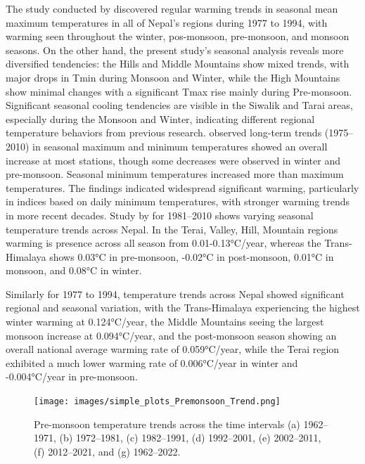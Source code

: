 The study conducted by \textcite{shrestha_climate_2011} discovered regular warming trends in seasonal mean maximum temperatures in all of Nepal's regions during 1977 to 1994, with warming seen throughout the winter, pos-monsoon, pre-monsoon, and monsoon seasons. On the other hand, the present study's seasonal analysis reveals more diversified tendencies: the Hills and Middle Mountains show mixed trends, with major drops in Tmin during Monsoon and Winter, while the High Mountains show minimal changes with a significant Tmax rise mainly during Pre-monsoon. Significant seasonal cooling tendencies are visible in the Siwalik and Tarai areas, especially during the Monsoon and Winter, indicating different regional temperature behaviors from previous research. \textcite{shrestha_observed_2017} observed long-term trends (1975--2010) in seasonal maximum and minimum temperatures showed an overall increase at most stations, though some decreases were observed in winter and pre-monsoon. Seasonal minimum temperatures increased more than maximum temperatures. The findings indicated widespread significant warming, particularly in indices based on daily minimum temperatures, with stronger warming trends in more recent decades. Study  by \textcite{nayava_spatial_2017} for 1981--2010 shows varying seasonal temperature trends across Nepal. In the Terai, Valley, Hill, Mountain regions warming is presence across all season from 0.01-0.13°C/year, whereas the Trans-Himalaya shows 0.03°C in pre-monsoon, -0.02°C in post-monsoon, 0.01°C in monsoon, and 0.08°C in winter.


Similarly \textcite{shrestha_maximum_1999} for 1977 to 1994, temperature trends across Nepal showed significant regional and seasonal variation, with the Trans-Himalaya experiencing the highest winter warming at 0.124°C/year, the Middle Mountains seeing the largest monsoon increase at 0.094°C/year, and the post-monsoon season showing an overall national average warming rate of 0.059°C/year, while the Terai region exhibited a much lower warming rate of 0.006°C/year in winter and -0.004°C/year in pre-monsoon.

\begin{figure}[H] 
  \centering
  \texttt{[image: images/simple\_plots\_Premonsoon\_Trend.png]}  
  \caption{Pre-monsoon temperature trends across the time intervals (a) 1962–1971, (b) 1972–1981, (c) 1982–1991, (d) 1992–2001, (e) 2002–2011, (f) 2012–2021, and (g) 1962–2022.} 
  \label{fig:Pre_monsoon_temperature_trends}  
\end{figure}

